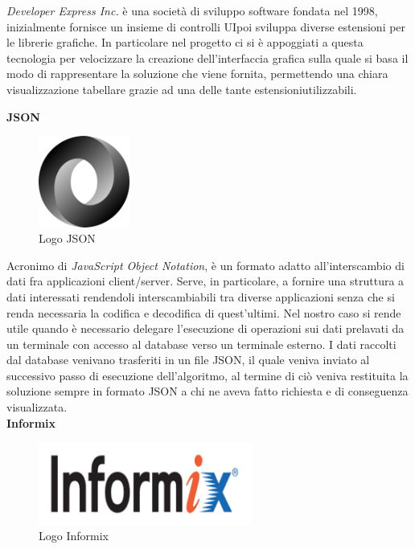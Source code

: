 \textit{Developer Express Inc.} è una società di sviluppo software fondata nel 1998, inizialmente fornisce un insieme di controlli UI\glosp poi sviluppa diverse estensioni per le librerie grafiche.
In particolare nel progetto ci si è appoggiati a questa tecnologia per velocizzare la creazione dell'interfaccia grafica sulla quale si basa il modo di rappresentare la soluzione
che viene fornita, permettendo una chiara visualizzazione tabellare grazie ad una delle tante estensioni\glosp utilizzabili. 

\newpage
\textbf{JSON}

\begin{figure}[H]
	\includegraphics[width=3cm]{immagini/json.png}
	\centering
	\caption{Logo JSON}
\end{figure}

Acronimo di \textit{JavaScript Object Notation}, è un formato adatto all'interscambio di dati fra applicazioni client/server\glo.
Serve, in particolare, a fornire una struttura a dati interessati rendendoli interscambiabili tra diverse applicazioni senza che si renda necessaria la codifica e decodifica di quest'ultimi.
Nel nostro caso si rende utile quando è necessario delegare l'esecuzione di operazioni sui dati prelavati da un terminale con accesso al database verso un terminale esterno.
I dati raccolti dal database venivano trasferiti in un file JSON, il quale veniva inviato al successivo passo di esecuzione dell'algoritmo, al termine di ciò veniva restituita
la soluzione sempre in formato JSON a chi ne aveva fatto richiesta e di conseguenza visualizzata.\\

\textbf{Informix}

\begin{figure}[H]
	\includegraphics[width=7cm]{immagini/Informix.png}
	\centering
	\caption{Logo Informix}
\end{figure}


